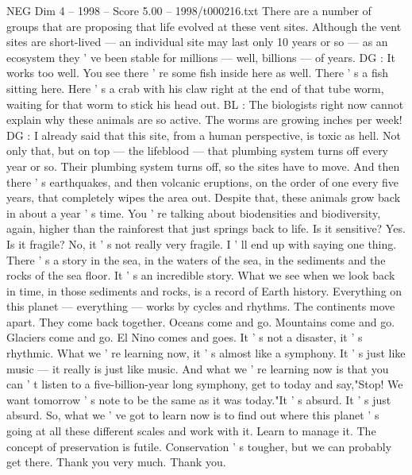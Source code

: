 \begin{textsample}{NEG Dim 4 – 1998 – Score 5.00 – 1998/t000216.txt}
There are a number of groups that are proposing that life evolved at these vent sites.
Although the vent sites are short-lived — an individual site may last only 10 years or so — as an ecosystem they ' ve been stable for millions — well, billions — of years.
DG : It works too well.
You see there ' re some fish inside here as well.
There ' s a fish sitting here.
Here ' s a crab with his claw right at the end of that tube worm, waiting for that worm to stick his head out.
BL : The biologists right now cannot explain why these animals are so active.
The worms are growing inches per week!
DG : I already said that this site, from a human perspective, is toxic as hell.
Not only that, but on top — the lifeblood — that plumbing system turns off every year or so.
Their plumbing system turns off, so the sites have to move.
And then there ' s earthquakes, and then volcanic eruptions, on the order of one every five years, that completely wipes the area out.
Despite that, these animals grow back in about a year ' s time.
You ' re talking about biodensities and biodiversity, again, higher than the rainforest that just springs back to life.
Is it sensitive?
Yes.
Is it fragile?
No, it ' s not really very fragile.
I ' ll end up with saying one thing.
There ' s a story in the sea, in the waters of the sea, in the sediments and the rocks of the sea floor.
It ' s an incredible story.
What we see when we look back in time, in those sediments and rocks, is a record of Earth history.
Everything on this planet — everything — works by cycles and rhythms.
The continents move apart.
They come back together.
Oceans come and go.
Mountains come and go.
Glaciers come and go.
El Nino comes and goes.
It ' s not a disaster, it ' s rhythmic.
What we ' re learning now, it ' s almost like a symphony.
It ' s just like music — it really is just like music.
And what we ' re learning now is that you can ' t listen to a five-billion-year long symphony, get to today and say,"Stop!
We want tomorrow ' s note to be the same as it was today."It ' s absurd.
It ' s just absurd.
So, what we ' ve got to learn now is to find out where this planet ' s going at all these different scales and work with it.
Learn to manage it.
The concept of preservation is futile.
Conservation ' s tougher, but we can probably get there.
Thank you very much.
Thank you.

\end{textsample}
